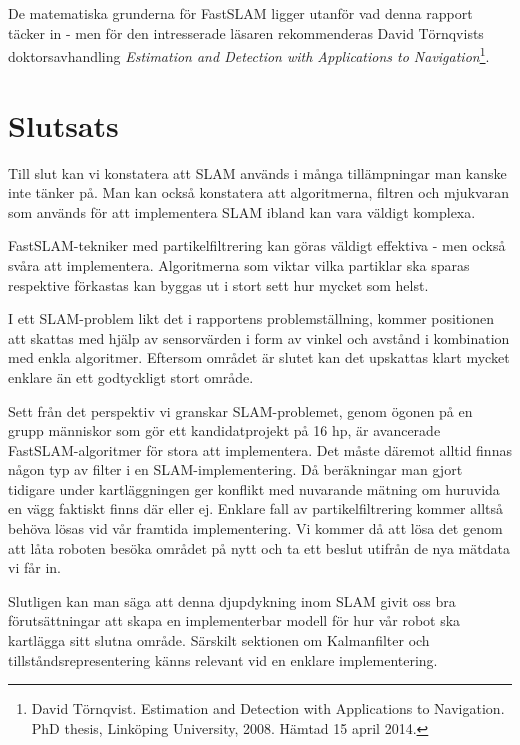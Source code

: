 \documentclass[a4paper,12pt,fleqn]{article}
\begin{document}
De matematiska grunderna för FastSLAM ligger utanför vad denna rapport täcker in - men för den intresserade läsaren rekommenderas David Törnqvists doktorsavhandling \textit{Estimation and Detection with Applications to Navigation}\footnote{David Törnqvist. Estimation and Detection with Applications to Navigation. PhD thesis, Linköping University, 2008. Hämtad 15 april 2014.}.

\newpage
\section{Slutsats}

Till slut kan vi konstatera att SLAM används i många tillämpningar man kanske inte tänker på. Man kan också konstatera att algoritmerna, filtren och mjukvaran som används för att implementera SLAM ibland kan vara väldigt komplexa. 

FastSLAM-tekniker med partikelfiltrering kan göras väldigt effektiva - men också svåra att implementera. Algoritmerna som viktar vilka partiklar ska sparas respektive förkastas kan byggas ut i stort sett hur mycket som helst. 

I ett SLAM-problem likt det i rapportens problemställning, kommer positionen att skattas med hjälp av sensorvärden i form av vinkel och avstånd i kombination med enkla algoritmer. Eftersom området är slutet kan det upskattas klart mycket enklare än ett godtyckligt stort område. 

Sett från det perspektiv vi granskar SLAM-problemet, genom ögonen på en grupp människor som gör ett kandidatprojekt på 16 hp, är avancerade FastSLAM-algoritmer för stora att implementera. Det måste däremot alltid finnas någon typ av filter i en SLAM-implementering. Då beräkningar man gjort tidigare under kartläggningen ger konflikt med nuvarande mätning om huruvida en vägg faktiskt finns där eller ej. Enklare fall av partikelfiltrering kommer alltså behöva lösas vid vår framtida implementering. Vi kommer då att lösa det genom att låta roboten besöka området på nytt och ta ett beslut utifrån de nya mätdata vi får in. 

Slutligen kan man säga att denna djupdykning inom SLAM givit oss bra förutsättningar att skapa en implementerbar modell för hur vår robot ska kartlägga sitt slutna område. Särskilt sektionen om Kalmanfilter och tillståndsrepresentering känns relevant vid en enklare implementering. 
\end{document}
